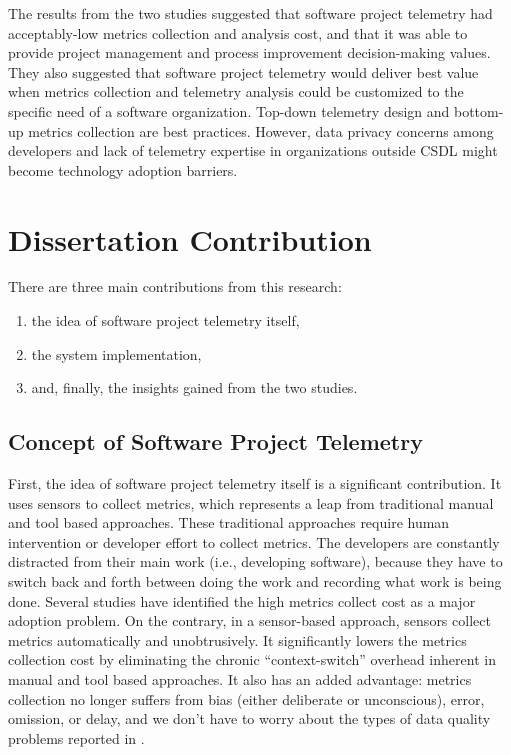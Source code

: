 The results from the two studies suggested that software project telemetry had acceptably-low metrics collection and analysis cost, and that it was able to provide project management and process improvement decision-making values. They also suggested that software project telemetry would deliver best value when metrics collection and telemetry analysis could be customized to the specific need of a software organization. Top-down telemetry design and bottom-up metrics collection are best practices. However, data privacy concerns among developers and lack of telemetry expertise in organizations outside CSDL might become technology adoption barriers. 






\section{Dissertation Contribution} \label{Conclusion:Contribution}

There are three main contributions from this research:
\begin{enumerate}
  \setlength{\itemsep}{0pt}
  \setlength{\parskip}{0pt}
	\item the idea of software project telemetry itself,
	\item the system implementation,
	\item and, finally, the insights gained from the two studies.
\end{enumerate}




\subsection{Concept of Software Project Telemetry}

First, the idea of software project telemetry itself is a significant contribution.
It uses sensors to collect metrics, which represents a leap from traditional manual and tool based approaches. These traditional approaches require human intervention or developer effort to collect metrics. The developers are constantly distracted from their main work (i.e., developing software), because they have to switch back and forth between doing the work and recording what work is being done. Several studies \cite{Borstler:2002, Humphrey:1995, Johnson:2003} have identified the high metrics collect cost as a major adoption problem. On the contrary, in a sensor-based approach, sensors collect metrics automatically and unobtrusively. It significantly lowers the metrics collection cost by eliminating the chronic ``context-switch'' overhead inherent in manual and tool based approaches. It also has an added advantage: metrics collection no longer suffers from bias (either deliberate or unconscious), error, omission, or delay, and we don't have to worry about the types of data quality problems reported in \cite{Johnson:1998}.

